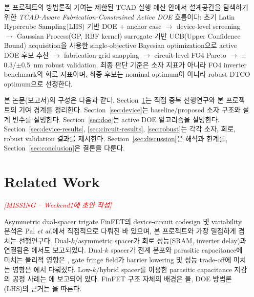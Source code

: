 \documentclass[journal]{IEEEtran}
\newcommand{\missing}[1]{\textcolor{red}{\textit{[MISSING -- #1]}}}
\begin{document}
본 프로젝트의 방법론적 기여는 제한된 TCAD 실행 예산 안에서 설계공간을 탐색하기 위한 \emph{TCAD-Aware Fabrication-Constrained Active DOE} 흐름이다: 초기 Latin Hypercube Sampling(LHS) 기반 DOE + anchor case $\rightarrow$ device-level screening $\rightarrow$ Gaussian Process(GP, RBF kernel) surrogate 기반 UCB(Upper Confidence Bound) acquisition을 사용한 single-objective Bayesian optimization으로 active DOE 후보 추천 $\rightarrow$ fabrication-grid snapping $\rightarrow$ circuit-level FO4 Pareto $\rightarrow$ $\pm$0.3/$\pm$0.5~nm robust validation. 최종 판단 기준은 소자 지표가 아니라 FO4 inverter benchmark의 회로 지표이며, 최종 후보는 nominal optimum이 아니라 robust DTCO optimum으로 선정한다.

본 논문(보고서)의 구성은 다음과 같다. \mbox{Section~\ref{sec:related}}는 직접 중복 선행연구와 본 프로젝트의 기여 경계를 정리한다. \mbox{Section~\ref{sec:device}}는 baseline/proposed 소자 구조와 설계 변수를 설명한다. \mbox{Section~\ref{sec:doe}}는 active DOE 알고리즘을 설명한다. \mbox{Section~\ref{sec:device-results}}, \mbox{\ref{sec:circuit-results}}, \mbox{\ref{sec:robust}}는 각각 소자, 회로, robust validation 결과를 제시한다. \mbox{Section~\ref{sec:discussion}}은 해석과 한계를, \mbox{Section~\ref{sec:conclusion}}은 결론을 다룬다.

\section{Related Work}
\label{sec:related}

\missing{Weekend1에 초안 작성}


Asymmetric dual-spacer trigate FinFET의 device-circuit codesign 및 variability 분석은 Pal \emph{et al.}\cite{Pal2015AsymmetricDualSpacer}에서 직접적으로 다뤄진 바 있으며, 본 프로젝트와 가장 밀접하게 겹치는 선행연구다. Dual-$k$/asymmetric spacer가 회로 성능(SRAM, inverter delay)과 연결됨은 \cite{Pal2013RobustSRAM,Pal2014SymmetricDualK,Pal2015Comparative,Pal2016Capacitive}에서도 보고되었다. Dual-$k$ spacer가 전계 분포와 parasitic capacitance에 미치는 물리적 영향은 \cite{Dutta2016ElectricField}, gate fringe field가 barrier lowering 및 성능 trade-off에 미치는 영향은 \cite{Sachid2008GFIBL}에서 다뤄졌다. Low-$k$/hybrid spacer를 이용한 parasitic capacitance 저감의 공정 사례는 \cite{Yamashita2015SiBCN,Gu2020HybridLowK}에 보고되어 있다. FinFET 구조 자체의 배경은 \cite{Hisamoto2000FinFET}을, DOE 방법론(LHS)의 근거는 \cite{McKay1979LHS}을 따른다.
\end{document}
